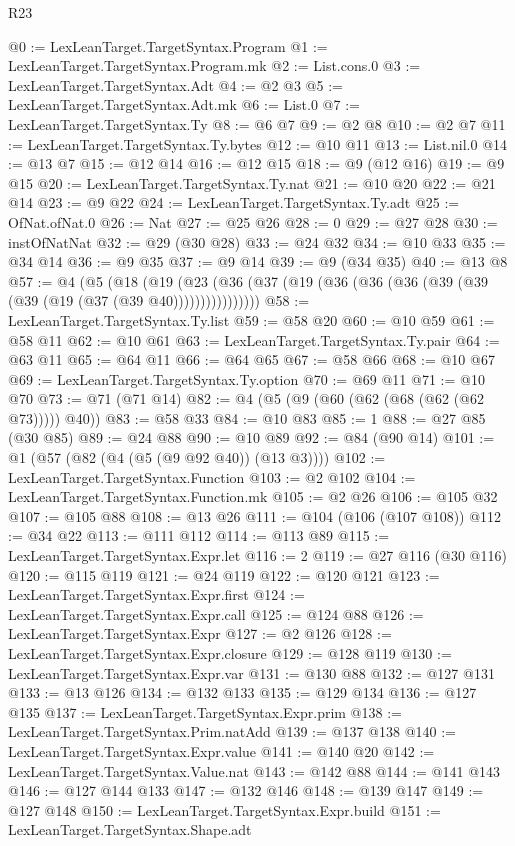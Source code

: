 \begin{lexlean}{R23}
\begin{coremodule}
@0 := LexLeanTarget.TargetSyntax.Program
@1 := LexLeanTarget.TargetSyntax.Program.mk
@2 := List.cons.{0}
@3 := LexLeanTarget.TargetSyntax.Adt
@4 := @2 @3
@5 := LexLeanTarget.TargetSyntax.Adt.mk
@6 := List.{0}
@7 := LexLeanTarget.TargetSyntax.Ty
@8 := @6 @7
@9 := @2 @8
@10 := @2 @7
@11 := LexLeanTarget.TargetSyntax.Ty.bytes
@12 := @10 @11
@13 := List.nil.{0}
@14 := @13 @7
@15 := @12 @14
@16 := @12 @15
@18 := @9 (@12 @16)
@19 := @9 @15
@20 := LexLeanTarget.TargetSyntax.Ty.nat
@21 := @10 @20
@22 := @21 @14
@23 := @9 @22
@24 := LexLeanTarget.TargetSyntax.Ty.adt
@25 := OfNat.ofNat.{0}
@26 := Nat
@27 := @25 @26
@28 := 0
@29 := @27 @28
@30 := instOfNatNat
@32 := @29 (@30 @28)
@33 := @24 @32
@34 := @10 @33
@35 := @34 @14
@36 := @9 @35
@37 := @9 @14
@39 := @9 (@34 @35)
@40 := @13 @8
@57 := @4
    (@5
      (@18 (@19 (@23 (@36 (@37 (@19 (@36 (@36 (@36 (@39 (@39 (@39 (@19 (@37 (@39 @40))))))))))))))))
@58 := LexLeanTarget.TargetSyntax.Ty.list
@59 := @58 @20
@60 := @10 @59
@61 := @58 @11
@62 := @10 @61
@63 := LexLeanTarget.TargetSyntax.Ty.pair
@64 := @63 @11
@65 := @64 @11
@66 := @64 @65
@67 := @58 @66
@68 := @10 @67
@69 := LexLeanTarget.TargetSyntax.Ty.option
@70 := @69 @11
@71 := @10 @70
@73 := @71 (@71 @14)
@82 := @4 (@5 (@9 (@60 (@62 (@68 (@62 (@62 @73))))) @40))
@83 := @58 @33
@84 := @10 @83
@85 := 1
@88 := @27 @85 (@30 @85)
@89 := @24 @88
@90 := @10 @89
@92 := @84 (@90 @14)
@101 := @1 (@57 (@82 (@4 (@5 (@9 @92 @40)) (@13 @3))))
@102 := LexLeanTarget.TargetSyntax.Function
@103 := @2 @102
@104 := LexLeanTarget.TargetSyntax.Function.mk
@105 := @2 @26
@106 := @105 @32
@107 := @105 @88
@108 := @13 @26
@111 := @104 (@106 (@107 @108))
@112 := @34 @22
@113 := @111 @112
@114 := @113 @89
@115 := LexLeanTarget.TargetSyntax.Expr.let
@116 := 2
@119 := @27 @116 (@30 @116)
@120 := @115 @119
@121 := @24 @119
@122 := @120 @121
@123 := LexLeanTarget.TargetSyntax.Expr.first
@124 := LexLeanTarget.TargetSyntax.Expr.call
@125 := @124 @88
@126 := LexLeanTarget.TargetSyntax.Expr
@127 := @2 @126
@128 := LexLeanTarget.TargetSyntax.Expr.closure
@129 := @128 @119
@130 := LexLeanTarget.TargetSyntax.Expr.var
@131 := @130 @88
@132 := @127 @131
@133 := @13 @126
@134 := @132 @133
@135 := @129 @134
@136 := @127 @135
@137 := LexLeanTarget.TargetSyntax.Expr.prim
@138 := LexLeanTarget.TargetSyntax.Prim.natAdd
@139 := @137 @138
@140 := LexLeanTarget.TargetSyntax.Expr.value
@141 := @140 @20
@142 := LexLeanTarget.TargetSyntax.Value.nat
@143 := @142 @88
@144 := @141 @143
@146 := @127 @144 @133
@147 := @132 @146
@148 := @139 @147
@149 := @127 @148
@150 := LexLeanTarget.TargetSyntax.Expr.build
@151 := LexLeanTarget.TargetSyntax.Shape.adt

\end{coremodule}
\end{lexlean}
